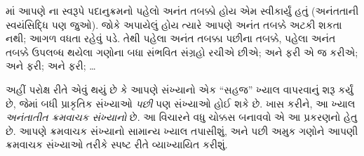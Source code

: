 \documentclass[../../../include/open-logic-section]{subfiles}
\begin{document}


માં આપણે \stagesinf{}ના સ્વરૂપે પદાનુક્રમનો
પહેલો અનંત તબક્કો હોય એમ સ્વીકાર્યું હતું (અનંતતાની સ્વયંસિદ્ધિ
પણ જુઓ). જોકે \stagessucc{} અપાયેલું હોય ત્યારે આપણે અનંત
તબક્કે અટકી શકતા નથી; આગળ વધતા રહેવું પડે. તેથી પહેલા
અનંત તબક્કા પછીના તબક્કે, પહેલા અનંત તબક્કે ઉપલબ્ધ થયેલા
ગણોના બધા સંભવિત સંગ્રહો રચીએ છીએ; અને ફરી એ જ કરીએ;
અને ફરી; અને ફરી; \dots

અહીં પરોક્ષ રીતે એવું થયું છે કે આપણે સંખ્યાનો એક
“સહજ” ખ્યાલ વાપરવાનું શરૂ કર્યું છે, જેમાં બધી પ્રાકૃતિક
સંખ્યાઓ \emph{પછી} પણ સંખ્યાઓ હોઈ શકે છે. ખાસ કરીને,
આ ખ્યાલ \emph{અનંતાતીત ક્રમવાચક સંખ્યાનો} છે.
આ વિચારને વધુ ચોક્કસ બનાવવો એ આ પ્રકરણનો હેતુ છે.
આપણે ક્રમવાચક સંખ્યાનો સામાન્ય ખ્યાલ તપાસીશું, અને પછી
અમુક ગણોને આપણી ક્રમવાચક સંખ્યાઓ તરીકે સ્પષ્ટ રીતે
વ્યાખ્યાયિત કરીશું.
\end{document}
